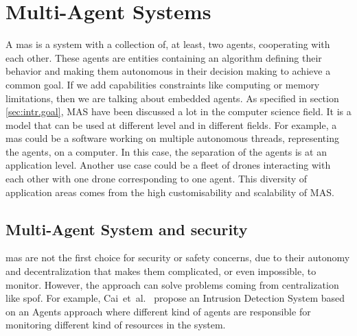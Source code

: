 \documentclass[12pt]{report}
\begin{document}
\section{Multi-Agent Systems}
\label{sec:bg:mas}
A \gls{mas} is a system with a collection of, at least, two agents, cooperating with each other. These agents are entities containing an algorithm defining their behavior and making them autonomous in their decision making to achieve a common goal. If we add capabilities constraints like computing or memory limitations, then we are talking about embedded agents.
As specified in section \ref{sec:intr.goal}, MAS have been discussed a lot in the computer science field.
It is a model that can be used at different level and in different fields. For example, a \gls{mas} could be a software working on multiple autonomous threads, representing the agents, on a computer. In this case, the separation of the agents is at an application level. Another use case could be a fleet of drones interacting with each other with one drone corresponding to one agent. This diversity of application areas comes from the high customisability and scalability of MAS. 



\subsection{Multi-Agent System and security}
\label{sec:bg:mas:secu}
\gls{mas} are not the first choice for security or safety concerns, due to their autonomy and decentralization that makes them complicated, or even impossible, to monitor. 
However, the approach can solve problems coming from centralization like \gls{spof}. For example, Cai~et~al.~\cite{cai_solutions_2012} propose an Intrusion Detection System based on
an Agents approach where different kind of agents are responsible for monitoring different kind of resources in the system.
\end{document}
